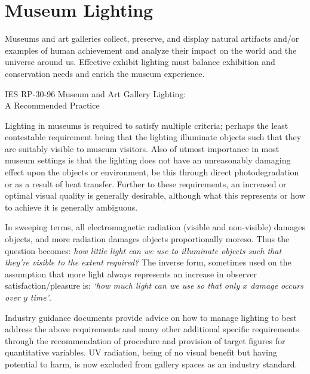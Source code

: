 \section{Museum Lighting}

\bigskip

\begin{itquote}{}
Museums and art galleries collect, preserve, and display natural artifacts and/or examples of human achievement and analyze their impact on the world and the universe around us. Effective exhibit lighting must balance exhibition and conservation needs and enrich the museum experience.
\end{itquote}

\begin{flushright}IES RP-30-96 Museum and Art Gallery Lighting: \\A Recommended Practice \citep{ies_ies_1996}\end{flushright}

\bigskip

Lighting in museums is required to satisfy multiple criteria; perhaps the least contestable requirement being that the lighting illuminate objects such that they are suitably visible to museum visitors. Also of utmost importance in most museum settings is that the lighting does not have an unreasonably damaging effect upon the objects or environment, be this through direct photodegradation or as a result of heat transfer. Further to these requirements, an increased or optimal visual quality is generally desirable, although what this represents or how to achieve it is generally ambiguous.

In sweeping terms, all electromagnetic radiation (visible and non-visible) damages objects, and more radiation damages objects proportionally moreso. Thus the question becomes: \emph{how little light can we use to illuminate objects such that they're visible to the extent required?} The inverse form, sometimes used on the assumption that more light always represents an increase in observer satisfaction/pleasure is: \emph{`how much light can we use so that only $x$ damage occurs over $y$ time'}. 

Industry guidance documents provide advice on how to manage lighting to best address the above requirements and many other additional specific requirements through the recommendation of procedure and provision of target figures for quantitative variables. \Gls{UV} radiation, being of no visual benefit but having potential to harm, is now excluded from gallery spaces as an industry standard. %

